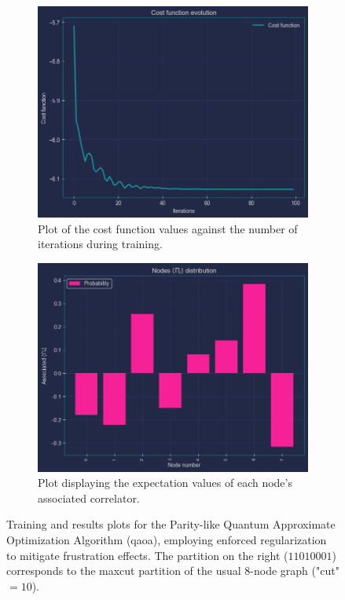 \begin{figure}[ht!]
    \centering
    \begin{subfigure}[t]{0.495\textwidth}
        \centering
        \includegraphics[width=1\textwidth,height=0.75\textwidth]{Figures/Chapter_6/Parity QAOA + Restrictions/Parity+Restriction_Training.png}
        \caption{Plot of the cost function values against the number of iterations during training.}
        \label{fig:Parity+Restriction_Training}
    \end{subfigure}
    \hfill
    \begin{subfigure}[t]{0.495\textwidth}
        \centering
        \includegraphics[width=1\textwidth,height=0.75\textwidth]{Figures/Chapter_6/Parity QAOA + Restrictions/Parity+Restriction_Results.png}
        \caption{Plot displaying the expectation values of each node's associated correlator.}
        \label{fig:Parity+Restriction_Results}
    \end{subfigure}
    \caption{Training and results plots for the Parity-like Quantum Approximate Optimization Algorithm (\acrshort{qaoa}), employing enforced regularization to mitigate frustration effects. The partition on the right ($11010001$) corresponds to the \acrshort{maxcut} partition of the usual $8$-node graph ("cut" $ = 10$).}
    \label{fig:Parity+Restriction}
\end{figure}

